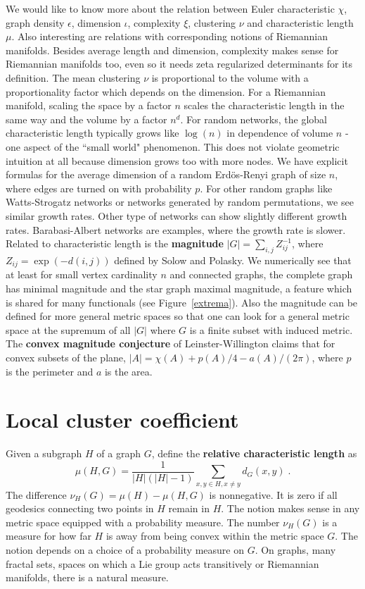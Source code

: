 \documentclass[12pt]{amsart}
\theoremstyle{definition}
\begin{document}
We would like to know more about the relation between Euler characteristic $\chi$, 
graph density $\epsilon$, dimension $\iota$, complexity $\xi$, clustering $\nu$ 
and characteristic length $\mu$. Also interesting are relations with corresponding notions 
of Riemannian manifolds. 
Besides average length and dimension, complexity makes sense for Riemannian manifolds too, even so it
needs zeta regularized determinants for its definition. 
The mean clustering $\nu$ is proportional to the volume with a proportionality factor which depends 
on the dimension.  For a Riemannian manifold, scaling the space by a factor $n$ scales the 
characteristic length in the same way and the volume by a factor $n^d$. For random networks, 
the global characteristic length
typically grows like $\log(n)$ in dependence of volume $n$ - one aspect of the  ``small world" phenomenon. 
This does not violate geometric intuition at all because dimension grows too with more nodes. 
We have explicit formulas \cite{randomgraph} for the average dimension of a random 
Erd\"os-Renyi graph of size $n$, where edges are turned on with probability $p$. 
For other random graphs like Watts-Strogatz networks or networks generated by random permutations, 
we see similar growth rates. Other type of networks can show slightly different growth rates.
Barabasi-Albert networks are examples, where the growth rate is slower. \\

Related to characteristic length is the {\bf magnitude} $|G|= \sum_{i,j} Z^{-1}_{ij}$, where
$Z_{ij} = \exp(-d(i,j))$ defined by Solow and Polasky. We numerically see that at least for
small vertex cardinality $n$ and connected graphs,
the complete graph has minimal magnitude and the star graph maximal magnitude, a feature which
is shared for many functionals (see Figure~\ref{extrema}). 
Also the magnitude can be defined for more general metric spaces so that one can look for a general metric 
space at the supremum of all $|G|$ where $G$ is a finite subset with induced metric. 
The {\bf convex magnitude conjecture} of Leinster-Willington claims that for convex 
subsets of the plane, $|A|=\chi(A) + p(A)/4 - a(A)/(2\pi)$, where $p$ is the perimeter 
and $a$ is the area.

\section{Local cluster coefficient}

Given a subgraph $H$ of a graph $G$, define the {\bf relative characteristic length} as
$$ \mu(H,G) = \frac{1}{|H| (|H|-1)} \sum_{x,y \in H, x \neq y}  d_G(x,y)   \; . $$
The difference $\nu_H(G) = \mu(H)-\mu(H,G)$ is nonnegative. It is zero if all geodesics 
connecting two points in $H$ remain in $H$. The notion makes sense in any metric 
space equipped with a probability measure. The number $\nu_H(G)$ is a measure for how 
far $H$ is away from being convex within the metric space $G$. The notion depends on a choice
of a probability measure on $G$. On graphs, many fractal sets, spaces on which a Lie group
acts transitively or Riemannian manifolds, there is a natural measure. \\ 
\end{document}
